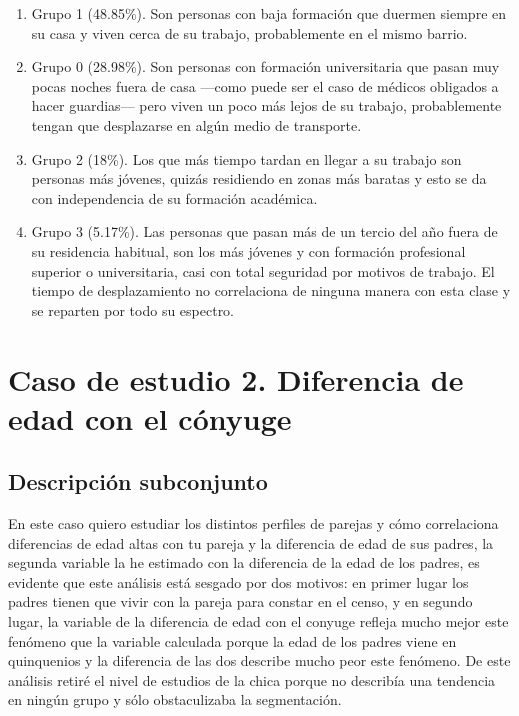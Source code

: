 \documentclass{article}
\begin{document}
\begin{enumerate}
\item Grupo 1 (48.85\%). Son personas con baja formación que duermen siempre en su casa y viven cerca de su trabajo, probablemente en el mismo barrio.
\item Grupo 0 (28.98\%). Son personas con formación universitaria que pasan muy pocas noches fuera de casa ---como puede ser el caso de médicos obligados a hacer guardias--- pero viven un poco más lejos de su trabajo, probablemente tengan que desplazarse en algún medio de transporte.
\item Grupo 2 (18\%). Los que más tiempo tardan en llegar a su trabajo son personas más jóvenes, quizás residiendo en zonas más baratas y esto se da con independencia de su formación académica.
\item Grupo 3 (5.17\%). Las personas que pasan más de un tercio del año fuera de su residencia habitual, son los más jóvenes y con formación profesional superior o universitaria, casi con total seguridad por motivos de trabajo. El tiempo de desplazamiento no correlaciona de ninguna manera con esta clase y se reparten por todo su espectro.
\end{enumerate}

\section{Caso de estudio 2. Diferencia de edad con el cónyuge}

\subsection{Descripción subconjunto}

En este caso quiero estudiar los distintos perfiles de parejas y cómo correlaciona diferencias de edad altas con tu pareja y la diferencia de edad de sus padres, la segunda variable la he estimado con la diferencia de la edad de los padres, es evidente que este análisis está sesgado por dos motivos: en primer lugar los padres tienen que vivir con la pareja para constar en el censo, y en segundo lugar, la variable de la diferencia de edad con el conyuge refleja mucho mejor este fenómeno que la variable calculada porque la edad de los padres viene en quinquenios y la diferencia de las dos describe mucho peor este fenómeno. De este análisis retiré el nivel de estudios de la chica porque no describía una tendencia en ningún grupo y sólo obstaculizaba la segmentación. 
\end{document}
